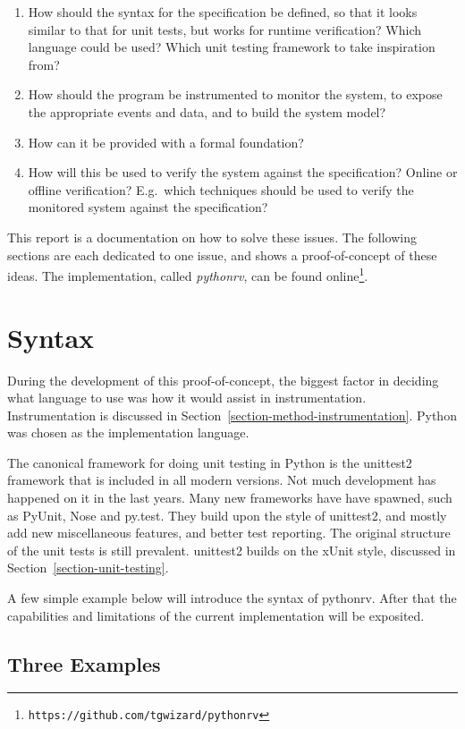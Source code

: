 \documentclass[a4paper,11pt]{kth-mag}
\begin{document}
\begin{enumerate}
	\item How should the syntax for the specification be defined, so that it
		looks similar to that for unit tests, but works for runtime verification?
		Which language could be used? Which unit testing framework to take
		inspiration from?
	\item How should the program be instrumented to monitor the system, to expose
		the appropriate events and data, and to build the system model?
	\item How can it be provided with a formal foundation?
	\item How will this be used to verify the system against the
		specification? Online or offline verification? E.g.\ which techniques
		should be used to verify the monitored system against the specification?
\end{enumerate}

This report is a documentation on how to solve these issues. The following
sections are each dedicated to one issue, and shows a proof-of-concept of these
ideas. The implementation, called \textit{pythonrv}, can be found
online\footnote{\texttt{https://github.com/tgwizard/pythonrv}}.

\section{Syntax}

During the development of this proof-of-concept, the biggest factor in deciding
what language to use was how it would assist in instrumentation.
Instrumentation is discussed in Section~\ref{section-method-instrumentation}.
Python was chosen as the implementation language.

The canonical framework for doing unit testing in Python is the unittest2
framework that is included in all modern versions. Not much development has
happened on it in the last years. Many new frameworks have have spawned, such
as PyUnit, Nose and py.test. They build upon the style of unittest2, and mostly
add new miscellaneous features, and better test reporting. The original
structure of the unit tests is still prevalent. unittest2 builds on the xUnit
style, discussed in Section~\ref{section-unit-testing}.

A few simple example below will introduce the syntax of pythonrv. After that
the capabilities and limitations of the current implementation will be
exposited.

\subsection{Three Examples}
\lstset{language=Python,numbers=left}
\end{document}
